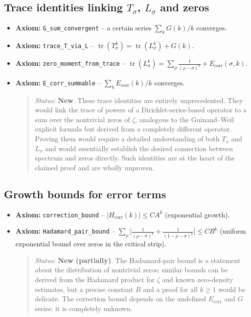\documentclass{article}
\begin{document}
\subsection{Trace identities linking $T_\sigma$, $L_\sigma$ and zeros}
\begin{itemize}
  \item \textbf{Axiom:} \texttt{G\_sum\_convergent} – a certain series $\sum_k G(k)/k$ converges.
  \item \textbf{Axiom:} \texttt{trace\_T\_via\_L} – $\operatorname{tr}(T_\sigma^k) = \operatorname{tr}(L_\sigma^k) + G(k)$.
  \item \textbf{Axiom:} \texttt{zero\_moment\_from\_trace} – 
  \(\operatorname{tr}(L_\sigma^k) = \sum_{\rho} \frac{1}{(\rho-\sigma)^k} + E_{\text{corr}}(\sigma,k)\).
  \item \textbf{Axiom:} \texttt{E\_corr\_summable} – $\sum_k E_{\text{corr}}(k)/k$ converges.
  \begin{quote}
    \emph{Status:} \textbf{New}.  These trace identities are entirely unprecedented.  They would link the trace of powers of a Dirichlet‑series‑based operator to a sum over the nontrivial zeros of $\zeta$, analogous to the Guinand–Weil explicit formula but derived from a completely different operator.  Proving them would require a detailed understanding of both $T_\sigma$ and $L_\sigma$ and would essentially establish the desired connection between spectrum and zeros directly.  Such identities are at the heart of the claimed proof and are wholly unproven.
  \end{quote}
\end{itemize}

\subsection{Growth bounds for error terms}
\begin{itemize}
  \item \textbf{Axiom:} \texttt{correction\_bound} – $|H_{\text{corr}}(k)| \le C A^k$ (exponential growth).
  \item \textbf{Axiom:} \texttt{Hadamard\_pair\_bound} – $\sum_{\rho} \bigl|\frac1{(\rho-\sigma)^k} + \frac1{(1-\rho-\sigma)^k}\bigr| \le C B^k$ (uniform exponential bound over zeros in the critical strip).
  \begin{quote}
    \emph{Status:} \textbf{New (partially)}.  The Hadamard‑pair bound is a statement about the distribution of nontrivial zeros; similar bounds can be derived from the Hadamard product for $\zeta$ and known zero‑density estimates, but a precise constant $B$ and a proof for all $k\ge1$ would be delicate.  The correction bound depends on the undefined $E_{\text{corr}}$ and $G$ series; it is completely unknown.
  \end{quote}
\end{itemize}
\end{document}
